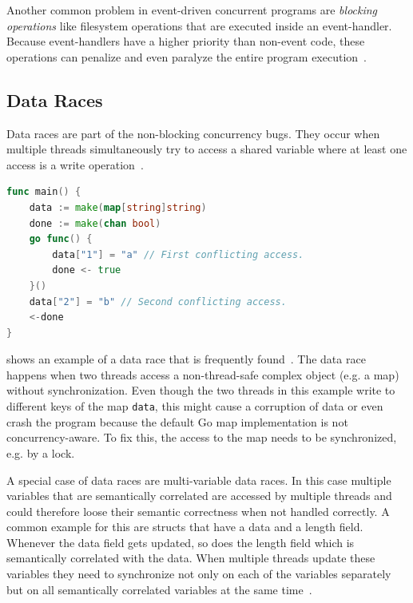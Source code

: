 \documentclass[english]{lni}
\begin{document}
Another common problem in event-driven concurrent programs are \emph{blocking operations} like filesystem operations that are executed inside an event-handler.
Because event-handlers have a higher priority than non-event code, these operations can penalize and even paralyze the entire program execution~\cite{tchamgoue2012testing}.

\subsection{Data Races}

Data races are part of the non-blocking concurrency bugs.
They occur when multiple threads simultaneously try to access a shared variable where at least one access is a write operation~\cite{serebry2009threadsanitizer}.

\begin{lstlisting}[float=h, language=Go, label=lst:race, caption=Data race by concurrently accessing a map]
func main() {
	data := make(map[string]string)
	done := make(chan bool)
	go func() {
		data["1"] = "a" // First conflicting access.
		done <- true
	}()
	data["2"] = "b" // Second conflicting access.
	<-done
}
\end{lstlisting}

 shows an example of a data race that is frequently found~\cite{serebry2009threadsanitizer}.
The data race happens when two threads access a non-thread-safe complex object (e.g. a map) without synchronization.
Even though the two threads in this example write to different keys of the map \lstinline{data}, this might cause a corruption of data or even crash the program because the default Go map implementation is not concurrency-aware.
To fix this, the access to the map needs to be synchronized, e.g. by a lock.

A special case of data races are multi-variable data races.
In this case multiple variables that are semantically correlated are accessed by multiple threads and could therefore loose their semantic correctness when not handled correctly.
A common example for this are structs that have a data and a length field.
Whenever the data field gets updated, so does the length field which is semantically correlated with the data.
When multiple threads update these variables they need to synchronize not only on each of the variables separately but on all semantically correlated variables at the same time~\cite{lu2007muvi}.
\end{document}
